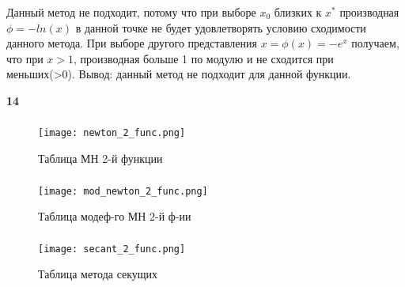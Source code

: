 \documentclass[a4paper,12pt]{article}
\begin{document}
Данный метод не подходит, потому что при выборе $x_0$ близких к $x^*$ производная $\phi = -ln(x)$ в данной точке не будет удовлетворять условию сходимости данного метода. При выборе другого представления $x = \phi(x) = -e^x$ получаем, что при $x>1$, производная больше 1 по модулю и не сходится при меньших(>0). Вывод: данный метод не подходит для данной функции.
\newpage
\begin{center}
{\bf14}\\
\vspace{0.5cm}
\end{center}
\setcounter{page}{14}
\subsubsection{}

\begin{figure}[h]
    \centering
    \texttt{[image: newton\_2\_func.png]}
    \caption{Таблица МН 2-й функции}
    \label{newton_2_graph}
\end{figure}


\subsubsection{}


\begin{figure}[h]
    \centering
    \texttt{[image: mod\_newton\_2\_func.png]}
    \caption{Таблица модеф-го МН 2-й ф-ии   }
    \label{mod_newton_2_graph}
\end{figure}


\subsubsection{}
\begin{figure}[h]
    \centering
    \texttt{[image: secant\_2\_func.png]}
    \caption{Таблица метода секущих}
    \label{newton_2_graph}
\end{figure}




\end{document}
